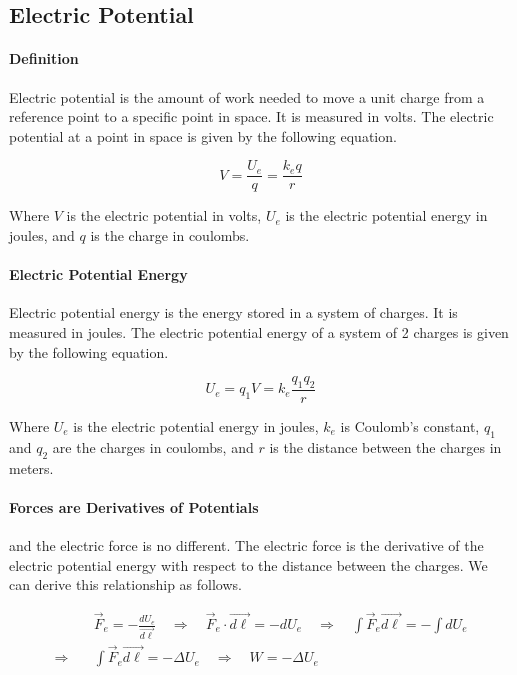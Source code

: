 \subsection{Electric Potential}
\hrulefill

\paragraph*{Definition}
Electric potential is the amount of work needed to move a unit charge from a reference point to a specific point in space.
It is measured in volts. The electric potential at a point in space is given by the following equation.

\begin{equation*}
    V = \frac{U_e}{q} = \frac{k_eq}{r}
\end{equation*}

Where $V$ is the electric potential in volts, $U_e$ is the electric potential energy in joules, and $q$ is the charge in coulombs.

\paragraph*{Electric Potential Energy}
Electric potential energy is the energy stored in a system of charges. It is measured in joules. The electric potential energy of a 
system of 2 charges is given by the following equation.

\begin{equation*}
    U_e = q_1V = k_e\frac{q_1q_2}{r}
\end{equation*}

Where $U_e$ is the electric potential energy in joules, $k_e$ is Coulomb's constant, $q_1$ and $q_2$ are the charges in coulombs, and $r$ is the distance between the charges in meters.

\paragraph*{Forces are Derivatives of Potentials}
and the electric force is no different. The electric force is the derivative of the electric potential energy with respect to the distance between the charges. 
We can derive this relationship as follows.

\begin{align*}
    &\quad \vec{F}_e = -\frac{dU_e}{\vec{d\ell}} \quad \Rightarrow \quad \vec{F}_e \cdot \vec{d\ell} = -dU_e \quad \Rightarrow \quad \int \vec{F}_e \vec{d\ell} = -\int dU_e\\
    \Rightarrow& \quad \int \vec{F}_e \vec{d\ell} = -\Delta U_e \quad \Rightarrow \quad W = -\Delta U_e
\end{align*}

